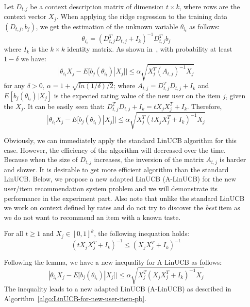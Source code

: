 \documentclass[twoside,leqno,twocolumn]{article}
\newcommand{\hai}[1]{\color{blue}(hai) #1\color{black}}
\begin{document}
Let $D_{t,j}$ be a context description matrix of dimension $t\times k$, where rows are the context vector $X_{j}$. When applying the ridge regression to the training data $(D_{t,j},b_{j})$, we get the estimation of the unknown variable $\theta_{i_{t}}$ as follows:
$$
\theta_{i_{t}} = (D^{T}_{t,j}D_{t,j}+I_{k})^{-1}D^{T}_{t,j}b_{j}
$$
where $I_{k}$ is the $k\times k$ identity matrix. As shown in~\cite{LinUCB}, with probability at least $1-\delta$ we have:
$$
|\theta_{i_{t}}X_{j}-E[b_{j}(\theta_{i_{t}})|X_{j}]|\leq \alpha\sqrt{X^{T}_{j}(A_{t,j})^{-1}X_{j}}
$$
for any $\delta > 0$, $\alpha=1+\sqrt{ln(1/\delta)/2}$; where $A_{t,j} = D^{T}_{t,j}D_{t,j}+I_{k}$ and $E[b_{j}(\theta_{i_{t}})|X_{j}]$ is the expected rating value of the new user on the item $j$, given the $X_{j}$. It can be easily seen that: $D^{T}_{t,j}D_{t,j}+I_{k} = tX_{j}X^{T}_{j}+I_{k}$. Therefore, 
$$
|\theta_{i_{t}}X_{j}-E[b_{j}(\theta_{i_{t}})|X_{j}]|\leq \alpha\sqrt{X^{T}_{j}(tX_{j}X^{T}_{j}+I_{k})^{-1}X_{j}}
$$

Obviously, we can immediately apply the standard LinUCB algorithm for this case. However, the efficiency of the algorithm will decreased over the time. Because when the size of $D_{t,j}$ increases, the inversion of the matrix $A_{t,j}$ is harder and slower. It is desirable to get more efficient algorithm than the standard LinUCB. Below, we propose a new adapted LinUCB (A-LinUCB) for the new user/item recommendation system problem and we will demonstrate its performance in the experiment part. Also note that unlike the standard LinUCB we work on context defined by rates and do not try to discover the \emph{best} item as we do not want to recommend an item with a known taste.

\begin{lemma}
  For all $t\geq 1$ and $X_{j} \in [0,1]^{k}$, the following inequation holds:
  $$
    (tX_{j}X^{T}_{j}+I_{k})^{-1} \leq (X_{j}X^{T}_{j}+I_{k})^{-1}
  $$ 
\end{lemma}

Following the lemma, we have a new inequality for A-LinUCB as follows:
$$
|\theta_{i_{t}}X_{j}-E[b_{j}(\theta_{i_{t}})|X_{j}]|\leq \alpha\sqrt{X^{T}_{j}(X_{j}X^{T}_{j}+I_{k})^{-1}X_{j}}
$$
The inequality leads to a new adapted LinUCB (A-LinUCB) as described in Algorithm~\ref{algo:LinUCB-for-new-user-item-pb}.
\end{document}
